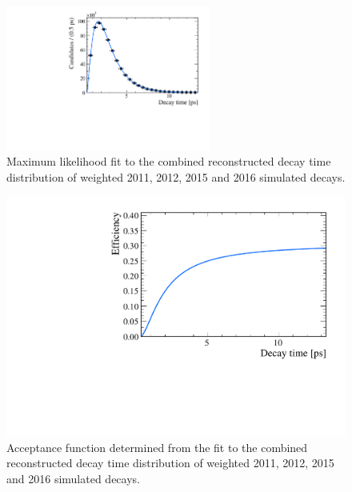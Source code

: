 \begin{figure}[tbp]
    \centering
        \includegraphics[width= 0.6\textwidth]{./Figs/LifetimeMeasurement/Bs2MuMu_Acceptance_fit.pdf}
    \caption{Maximum likelihood fit to the combined reconstructed decay time distribution of weighted 2011, 2012, 2015 and 2016 simulated \bsmumu decays. }
    \label{fig:accptfit}
\end{figure}


\begin{figure}[tbp]
    \centering
        \includegraphics[width= 0.6 \textwidth]{./Figs/LifetimeMeasurement/Bs2MuMu_Acceptance_plot_no_points.pdf}

    \caption{Acceptance function determined from the fit to the combined reconstructed decay time distribution of weighted 2011, 2012, 2015 and 2016 simulated \bsmumu decays.} %
    \label{fig:accptplot}
\end{figure}


